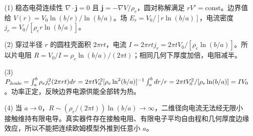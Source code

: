 (1) 稳态电荷连续性 \(\nabla\cdot\mathbf j=0\) 且 \(\mathbf j=-\nabla V/\rho_e\)，圆对称解满足 \(rV'=\mathrm{const}\)。边界值给 \(V(r)=V_0\ln(b/r)/\ln(b/a)\)。场 \(E_r=V_0/[r\ln(b/a)]\)，电流密度 \(j_r=V_0/[\rho_e r\ln(b/a)]\)。

(2) 穿过半径 \(r\) 的圆柱壳面积 \(2\pi rt\)，电流 \(I=2\pi rt j_r=2\pi tV_0/[\rho_e\ln(b/a)]\)。所以片电阻 \(R=V_0/I=\rho_e\ln(b/a)/(2\pi t)\)；相同几何下厚度加倍，电阻减半。

(3) \(P_{\rm Joule}=\int_a^b\rho_ej_r^2(2\pi rt)dr=2\pi tV_0^2[\rho_e\ln^2(b/a)]^{-1}\int_a^b dr/r=2\pi tV_0^2/[\rho_e\ln(b/a)]=IV_0\)。功率正定，反映边界电源供能全部转为热。

(4) 当 \(a\to0\)，\(R\sim(\rho_e/(2\pi t))\ln(b/a)\to\infty\)，二维径向电流无法经无限小接触维持有限电导。真实器件存在接触电阻、有限电子平均自由程和几何厚度边缘效应，所以不能把连续欧姆模型外推到任意小 \(a\)。

